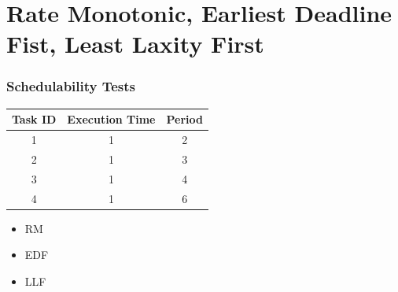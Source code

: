 \documentclass[xcolor=table]{beamer}
\begin{document}
\section{Rate Monotonic, Earliest Deadline Fist, Least Laxity First}
\begin{frame}
\frametitle{Schedulability Tests}
\begin{table}[]
\begin{tabular}{|c|c|c|}
\hline
\textbf{Task ID} & \textbf{Execution Time} & \textbf{Period}\\ \hline
\cellcolor[HTML]{ECF6CE}1 &\cellcolor[HTML]{ECF6CE}1 &\cellcolor[HTML]{ECF6CE}2 \\ \hline
\cellcolor[HTML]{A4A4A4}2 &\cellcolor[HTML]{A4A4A4}1 &\cellcolor[HTML]{A4A4A4}3 \\ \hline
\cellcolor[HTML]{F781D8}3 &\cellcolor[HTML]{F781D8}1 &\cellcolor[HTML]{F781D8}4 \\ \hline
\cellcolor[HTML]{8181F7}4 &\cellcolor[HTML]{8181F7}1 &\cellcolor[HTML]{8181F7}6 \\ \hline
\end{tabular}
\end{table}
\begin{itemize}
\item RM
\item EDF
\item LLF
\end{itemize}
\end{frame}
\end{document}
